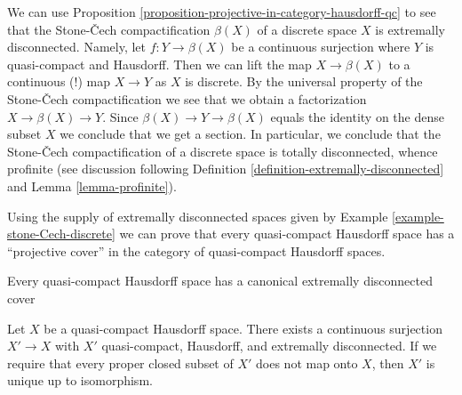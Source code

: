 \begin{example}
\label{example-stone-Cech-discrete}
We can use Proposition \ref{proposition-projective-in-category-hausdorff-qc}
to see that the Stone-{\v C}ech compactification $\beta(X)$ of a discrete
space $X$ is extremally disconnected. Namely, let $f : Y \to \beta(X)$ be
a continuous surjection where $Y$ is quasi-compact and Hausdorff. Then
we can lift the map $X \to \beta(X)$ to a continuous (!) map
$X \to Y$ as $X$ is discrete. By the universal property of the
Stone-{\v C}ech compactification we see that we obtain a factorization
$X \to \beta(X) \to Y$. Since $\beta(X) \to Y \to \beta(X)$ equals
the identity on the dense subset $X$ we conclude that we get a section.
In particular, we conclude that the Stone-{\v C}ech compactification
of a discrete space is totally disconnected, whence profinite
(see discussion following
Definition \ref{definition-extremally-disconnected} and
Lemma \ref{lemma-profinite}).
\end{example}

\noindent
Using the supply of extremally disconnected spaces given by
Example \ref{example-stone-Cech-discrete}
we can prove that every quasi-compact Hausdorff space has a
``projective cover'' in the category of quasi-compact Hausdorff spaces.

\begin{lemma}
\label{lemma-existence-projective-cover}
\begin{slogan}
Every quasi-compact Hausdorff space has a canonical
extremally disconnected cover
\end{slogan}
Let $X$ be a quasi-compact Hausdorff space.
There exists a continuous surjection $X' \to X$ with $X'$
quasi-compact, Hausdorff, and extremally disconnected.
If we require that every proper closed subset of $X'$ does not
map onto $X$, then $X'$ is unique up to isomorphism.
\end{lemma}

